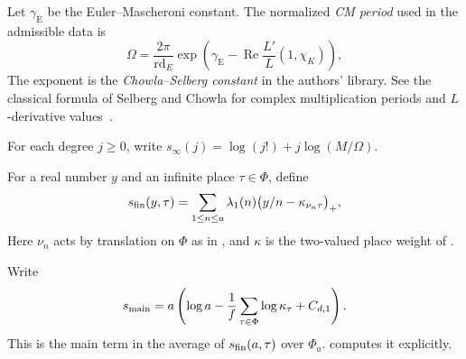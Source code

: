 \begin{definition}[CM period]
\label{def:cm-period}
\emitthmsource
Let $\gamma_{\mathrm E}$ be the Euler--Mascheroni constant. The normalized \emph{CM period} used in the admissible data is
\begin{equation}
 \Omega=\frac{2\pi}{\mathrm{rd}_E}
       \exp\!\left(\gamma_{\mathrm E}-\operatorname{Re}
                       \frac{L'}{L}(1,\chi_K)\right),
\label{eq:cm-period}
\end{equation}
The exponent is the \emph{Chowla--Selberg constant} in the authors' library. See the classical formula of Selberg and Chowla for complex multiplication periods and $L$-derivative values~\cite{SelbergChowla1967}.
\end{definition}

\begin{definition}
\label{def:jet-size}
\emitthmsource
For each degree $j\ge0$, write $s_\infty(j)=\log(j!)+j\log(M/\Omega)$.
\end{definition}

\begin{definition}
\label{def:weighted-prime-sum}
\emitthmsource
For a real number $y$ and an infinite place $\tau\in\Phi$, define
\begin{equation}
 s_{\rm fin}(y,\tau)
 =\sum_{1\le n\le a}\lambda_1(n)
       \bigl(y/n-\kappa_{\nu_n\tau}\bigr)_+ ,
\label{eq:weighted-prime-sum}
\end{equation}
Here $\nu_n$ acts by translation on $\Phi$ as in , and $\kappa$ is the two-valued place weight of .
\end{definition}

\begin{definition}
\label{def:prime-sum-main-term}
\emitthmsource
Write
\[
 s_{\rm main}
 =a\left(\log a-\frac1f\sum_{\tau\in\Phi}\log\kappa_\tau+C_{d,1}\right).
\]
This is the main term in the average of $s_{\rm fin}(a,\tau)$ over $\Phi_a$.  computes it explicitly.
\end{definition}

